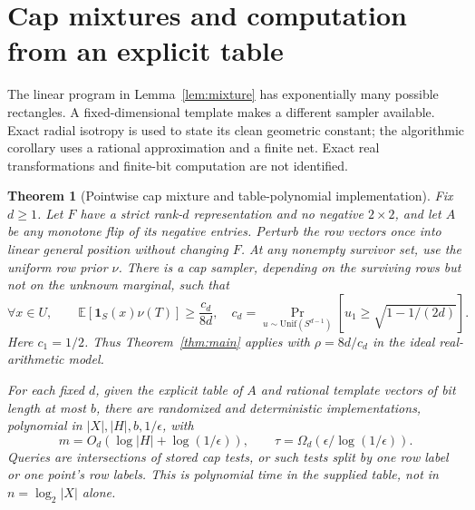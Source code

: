 \documentclass[11pt]{article}
\newtheorem{theorem}{Theorem}
\newcommand{\E}{\mathbb E}
\newcommand{\1}{\mathbf 1}
\begin{document}
\section{Cap mixtures and computation from an explicit table}\label{sec:caps}
The linear program in Lemma~\ref{lem:mixture} has exponentially many possible rectangles. A fixed-dimensional template makes a different sampler available. Exact radial isotropy is used to state its clean geometric constant; the algorithmic corollary uses a rational approximation and a finite net. Exact real transformations and finite-bit computation are not identified.

\begin{samepage}
\begin{theorem}[Pointwise cap mixture and table-polynomial implementation]\label{thm:caps}
Fix $d\ge1$. Let $F$ have a strict rank-$d$ representation and no negative $2\times2$, and let $A$ be any monotone flip of its negative entries. Perturb the row vectors once into linear general position without changing $F$. At any nonempty survivor set, use the uniform row prior $\nu$. There is a cap sampler, depending on the surviving rows but not on the unknown marginal, such that
\begin{equation}\label{eq:capcoverage}
 \forall x\in U,\qquad \E[\1_S(x)\nu(T)]\ge\frac{c_d}{8d},
 \quad c_d=\Pr_{u\sim\mathrm{Unif}(S^{d-1})}
 [u_1\ge\sqrt{1-1/(2d)}].
\end{equation}
Here $c_1=1/2$. Thus Theorem~\ref{thm:main} applies with $\rho=8d/c_d$ in the ideal real-arithmetic model.

For each fixed $d$, given the explicit table of $A$ and rational template vectors of bit length at most $b$, there are randomized and deterministic implementations, polynomial in $|X|,|H|,b,1/\epsilon$, with
\[
 m=O_d(\log|H|+\log(1/\epsilon)),\qquad
 \tau=\Omega_d(\epsilon/\log(1/\epsilon)).
\]
Queries are intersections of stored cap tests, or such tests split by one row label or one point's row labels. This is polynomial time in the supplied table, not in $n=\log_2|X|$ alone.
\end{theorem}
\end{samepage}
\end{document}
